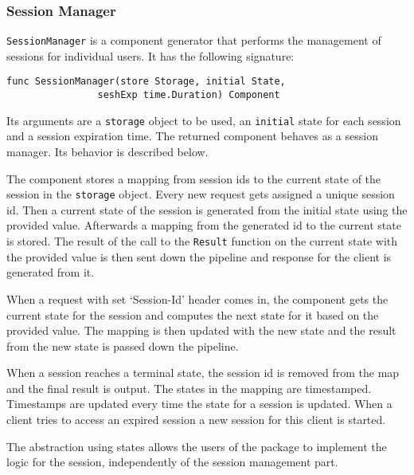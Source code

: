 \subsubsection{Session Manager}
\texttt{SessionManager} is a component generator that performs the 
management of sessions for individual users. It has the following signature:
\begin{lstlisting}
func SessionManager(store Storage, initial State, 
                seshExp time.Duration) Component
\end{lstlisting}
Its arguments are a \texttt{storage} object to be used, an \texttt{initial} 
state for each session and
a session expiration time.
The returned component behaves as a session manager. 
Its behavior is described below.

The component stores a mapping from session ids to the current state of the session
in the \texttt{storage} object.
Every new request gets assigned a unique session id. Then a current state
of the session is generated from the initial state using the provided
value. Afterwards a mapping from the generated id to the current state
is stored. The result of the call to the \texttt{Result} function on the
current state with the provided value is then sent down the pipeline and
response for the client is generated from it.

When a request with set `Session-Id' header comes in, the component gets the current 
state for the session and computes the next state for it based on the provided value.
The mapping is then updated with the new state and the result from the new state
is passed down the pipeline.

When a session reaches a terminal state, the session id is removed from the map
and the final result is output.
The states in the mapping are timestamped. Timestamps are updated every time
the state for a session is updated. When a client tries to access an expired
session a new session for this client is started.

The abstraction using states allows the users of the package to implement the
logic for the session, independently of the session management part.

